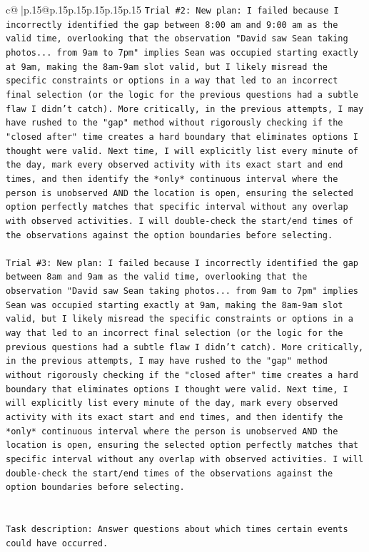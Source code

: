 \documentclass{article}
\begin{document}
{\begin{supertabular}{c@{$\;$}|p{.15\linewidth}@{}p{.15\linewidth}p{.15\linewidth}p{.15\linewidth}p{.15\linewidth}p{.15\linewidth}}
{{{\texttt{Trial \#2: New plan: I failed because I incorrectly identified the gap between 8:00 am and 9:00 am as the valid time, overlooking that the observation "David saw Sean taking photos... from 9am to 7pm" implies Sean was occupied starting exactly at 9am, making the 8am{-}9am slot valid, but I likely misread the specific constraints or options in a way that led to an incorrect final selection (or the logic for the previous questions had a subtle flaw I didn't catch). More critically, in the previous attempts, I may have rushed to the "gap" method without rigorously checking if the "closed after" time creates a hard boundary that eliminates options I thought were valid. Next time, I will explicitly list every minute of the day, mark every observed activity with its exact start and end times, and then identify the *only* continuous interval where the person is unobserved AND the location is open, ensuring the selected option perfectly matches that specific interval without any overlap with observed activities. I will double{-}check the start/end times of the observations against the option boundaries before selecting.} \\
\\ 
\texttt{Trial \#3: New plan: I failed because I incorrectly identified the gap between 8am and 9am as the valid time, overlooking that the observation "David saw Sean taking photos... from 9am to 7pm" implies Sean was occupied starting exactly at 9am, making the 8am{-}9am slot valid, but I likely misread the specific constraints or options in a way that led to an incorrect final selection (or the logic for the previous questions had a subtle flaw I didn't catch). More critically, in the previous attempts, I may have rushed to the "gap" method without rigorously checking if the "closed after" time creates a hard boundary that eliminates options I thought were valid. Next time, I will explicitly list every minute of the day, mark every observed activity with its exact start and end times, and then identify the *only* continuous interval where the person is unobserved AND the location is open, ensuring the selected option perfectly matches that specific interval without any overlap with observed activities. I will double{-}check the start/end times of the observations against the option boundaries before selecting.} \\
\\ 
\\ 
\texttt{Task description: Answer questions about which times certain events could have occurred.} \\
}}}
\end{supertabular}}
\end{document}
